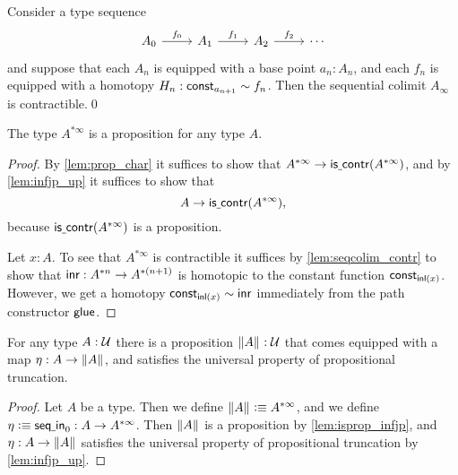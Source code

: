 \begin{lem}\label{lem:seqcolim_contr}
Consider a type sequence
\begin{equation*}
\begin{tikzcd}
A_0 \arrow[r,"f_0"] & A_1 \arrow[r,"f_1"] & A_2 \arrow[r,"f_2"] & \cdots
\end{tikzcd}
\end{equation*}
and suppose that each $A_n$ is equipped with a base point $a_n:A_n$, and each $f_n$ is equipped with a homotopy $H_n:\mathsf{const}_{a_{n+1}}\sim f_n$. Then the sequential colimit $A_\infty$ is contractible.\qed
\end{lem}

\begin{lem}\label{lem:isprop_infjp}
The type $A^{\ast\infty}$ is a proposition for any type $A$.
\end{lem}

\begin{proof}
By \cref{lem:prop_char} it suffices to show that $A^{\ast\infty}\to \mathsf{is\underline{\ }{}contr}(A^{\ast\infty})$, and by \cref{lem:infjp_up} it suffices to show that
\begin{equation*}
A\to \mathsf{is\underline{\ }{}contr}(A^{\ast\infty}),
\end{equation*}
because $\mathsf{is\underline{\ }{}contr}(A^{\ast\infty})$ is a proposition. 

Let $x:A$. To see that $A^{\ast\infty}$ is contractible it suffices by \cref{lem:seqcolim_contr} to show that ${\mathsf{inr}}:A^{\ast n}\to A^{\ast(n+1)}$ is homotopic to the constant function $\mathsf{const}_{{\mathsf{inl}}(x)}$. However, we get a homotopy $\mathsf{const}_{{\mathsf{inl}}(x)}\sim {\mathsf{inr}}$ immediately from the path constructor $\mathsf{glue}$.  
\end{proof}

\begin{thm}
For any type $A:\mathcal{U}$ there is a proposition $\Vert A\Vert_{}:\mathcal{U}$ that comes equipped with a map $\eta:A\to \Vert A\Vert_{}$, and satisfies the universal property of propositional truncation.
\end{thm}

\begin{proof}
Let $A$ be a type. Then we define $\Vert A\Vert_{}\vcentcolon\equiv A^{\ast\infty}$, and we define $\eta\vcentcolon\equiv \mathsf{seq\underline{\ }{}in}_0:A\to A^{\ast\infty}$. Then $\Vert A\Vert_{}$ is a proposition by \cref{lem:isprop_infjp}, and $\eta:A\to \Vert A\Vert_{}$ satisfies the universal property of propositional truncation by \cref{lem:infjp_up}.
\end{proof}

